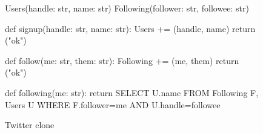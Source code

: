 \begin{figure}[t]
  \centering
  {
    \small
    \begin{Python}[gobble=3]
      Users(handle: str, name: str)
      Following(follower: str, followee: str)

      def signup(handle: str, name: str):
        Users += {(handle, name)}
        return {("ok")}

      def follow(me: str, them: str):
        Following += {(me, them)}
        return {("ok")}

      def following(me: str):
        return SELECT U.name
               FROM Following F, Users U
               WHERE F.follower=me AND U.handle=followee
    \end{Python}
  }
  \caption{\dedalusplus{} Twitter clone}
\end{figure}
